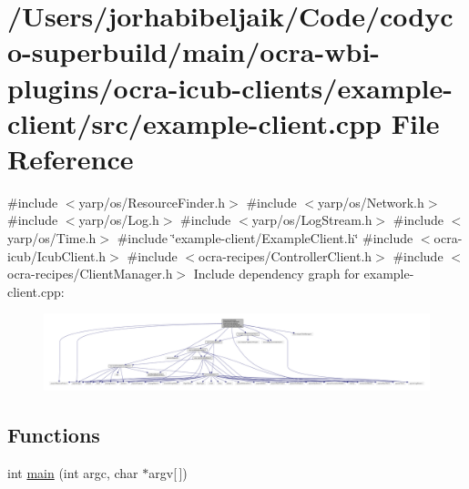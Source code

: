\hypertarget{example-client_8cpp}{}\section{/\+Users/jorhabibeljaik/\+Code/codyco-\/superbuild/main/ocra-\/wbi-\/plugins/ocra-\/icub-\/clients/example-\/client/src/example-\/client.cpp File Reference}
\label{example-client_8cpp}
{\ttfamily \#include $<$yarp/os/\+Resource\+Finder.\+h$>$}\newline
{\ttfamily \#include $<$yarp/os/\+Network.\+h$>$}\newline
{\ttfamily \#include $<$yarp/os/\+Log.\+h$>$}\newline
{\ttfamily \#include $<$yarp/os/\+Log\+Stream.\+h$>$}\newline
{\ttfamily \#include $<$yarp/os/\+Time.\+h$>$}\newline
{\ttfamily \#include \char`\"{}example-\/client/\+Example\+Client.\+h\char`\"{}}\newline
{\ttfamily \#include $<$ocra-\/icub/\+Icub\+Client.\+h$>$}\newline
{\ttfamily \#include $<$ocra-\/recipes/\+Controller\+Client.\+h$>$}\newline
{\ttfamily \#include $<$ocra-\/recipes/\+Client\+Manager.\+h$>$}\newline
Include dependency graph for example-\/client.cpp\+:
\nopagebreak
\begin{figure}[H]
\begin{center}
\leavevmode
\includegraphics[width=350pt]{example-client_8cpp__incl}
\end{center}
\end{figure}
\subsection*{Functions}
\begin{DoxyCompactItemize}
\item 
int \hyperlink{example-client_8cpp_a0ddf1224851353fc92bfbff6f499fa97}{main} (int argc, char $\ast$argv\mbox{[}$\,$\mbox{]})
\end{DoxyCompactItemize}


